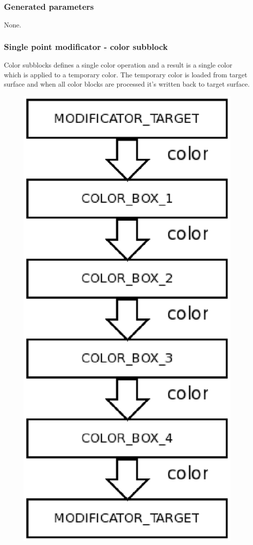 \documentclass[9pt]{article}
\begin{document}
\subsubsection*{Generated parameters}

None.

\subsubsection{Single point modificator - color subblock}

Color subblocks defines a single color operation and a result
is a single color which is applied to a temporary color. The temporary color
is loaded from target surface and when all color blocks are 
processed it's written back to target surface.

\begin{figure}[h]
\begin{center}
  \includegraphics[scale=0.6]{p04.eps}

\end{center}
\end{figure}
\end{document}
